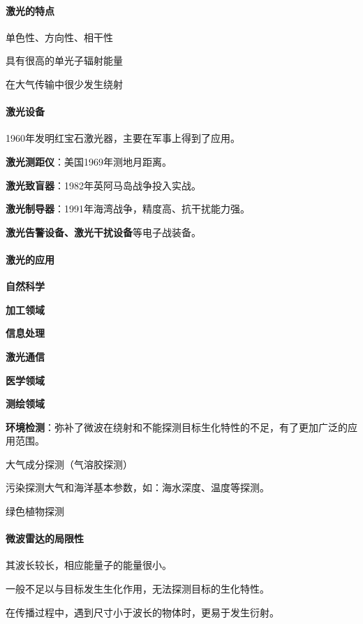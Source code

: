 \paragraph{激光的特点} \begin{itemize*}
	\item 单色性、方向性、相干性
	\item 具有很高的单光子辐射能量
	\item 在大气传输中很少发生绕射
\end{itemize*}
\paragraph{激光设备}1960年发明红宝石激光器，主要在军事上得到了应用。\begin{itemize*}
	\item \textbf{激光测距仪}：美国1969年测地月距离。
	\item \textbf{激光致盲器}：1982年英阿马岛战争投入实战。
	\item \textbf{激光制导器}：1991年海湾战争，精度高、抗干扰能力强。
	\item \textbf{激光告警设备、激光干扰设备}等电子战装备。
\end{itemize*}
\paragraph{激光的应用}\begin{itemize*}
	\item \textbf{自然科学}
	\item \textbf{加工领域}
	\item \textbf{信息处理}
	\item \textbf{激光通信}
	\item \textbf{医学领域}
	\item \textbf{测绘领域}
	\item \textbf{环境检测}：弥补了微波在绕射和不能探测目标生化特性的不足，有了更加广泛的应用范围。 \begin{itemize*}
		\item 大气成分探测（气溶胶探测）
		\item 污染探测大气和海洋基本参数，如：海水深度、温度等探测。
		\item 绿色植物探测
	\end{itemize*}
\end{itemize*}
\paragraph{微波雷达的局限性}\begin{itemize*}
	\item 其波长较长，相应能量子的能量很小。
	\item 一般不足以与目标发生生化作用，无法探测目标的生化特性。
	\item 在传播过程中，遇到尺寸小于波长的物体时，更易于发生衍射。
\end{itemize*}

